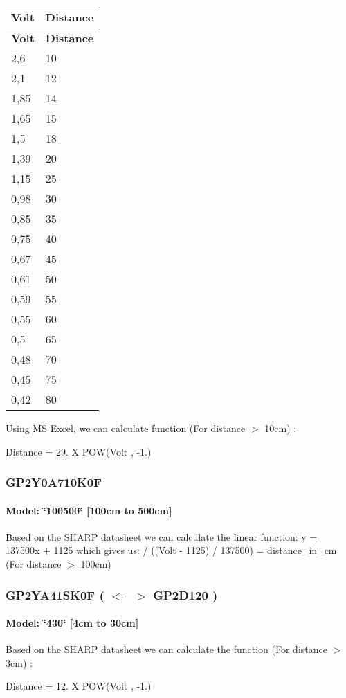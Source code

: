 \tabulinesep=1mm
\begin{longtabu} spread 0pt [c]{*{2}{|X[-1]}|}
\hline
\rowcolor{\tableheadbgcolor}\textbf{ Volt  }&\textbf{ Distance   }\\
\endfirsthead
\hline
\endfoot
\hline
\rowcolor{\tableheadbgcolor}\textbf{ Volt  }&\textbf{ Distance   }\\
,6  &10   \\
2,1  &12   \\
1,85  &14   \\
1,65  &15   \\
1,5  &18   \\
1,39  &20   \\
1,15  &25   \\
0,98  &30   \\
0,85  &35   \\
0,75  &40   \\
0,67  &45   \\
0,61  &50   \\
0,59  &55   \\
0,55  &60   \\
0,5  &65   \\
0,48  &70   \\
0,45  &75   \\
0,42  &80   \\
\end{longtabu}


Using MS Excel, we can calculate function (For distance $>$ 10cm) \+:

Distance = 29. X P\+OW(Volt , -\/1.)

\subsubsection*{G\+P2\+Y0\+A710\+K0F}

\paragraph*{Model\+: \char`\"{}100500\char`\"{} \mbox{[}100cm to 500cm\mbox{]}}

Based on the S\+H\+A\+RP datasheet we can calculate the linear function\+: {\ttfamily y = 137500x + 1125} which gives us\+: { / ((Volt -\/ 1125) / 137500) = distance\+\_\+in\+\_\+cm} (For distance $>$ 100cm)

\subsubsection*{G\+P2\+Y\+A41\+S\+K0F ( $<$=$>$ G\+P2\+D120 )}

\paragraph*{Model\+: \char`\"{}430\char`\"{} \mbox{[}4cm to 30cm\mbox{]}}

Based on the S\+H\+A\+RP datasheet we can calculate the function (For distance $>$ 3cm) \+:

Distance = 12. X P\+OW(Volt , -\/1.) 